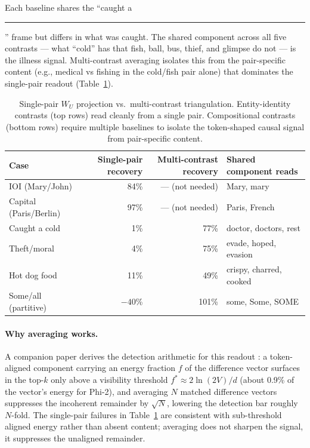 \documentclass[11pt]{article}
\newcommand{\WU}{W_U}
\begin{document}
Each baseline shares the ``caught a \rule{1em}{0.4pt}'' frame but differs in what was caught.
The shared component across all five contrasts --- what ``cold'' has that fish,
ball, bus, thief, and glimpse do not --- is the illness signal. Multi-contrast
averaging isolates this from the pair-specific content (e.g., medical vs
fishing in the cold/fish pair alone) that dominates the single-pair readout
(Table~\ref{tab:triangulation}).

\begin{table}[htbp]
\centering
\small
\begin{tabular}{lrrl}
\toprule
Case & Single-pair recovery & Multi-contrast recovery & Shared component reads \\
\midrule
IOI (Mary/John) & 84\% & --- (not needed) & Mary, mary \\
Capital (Paris/Berlin) & 97\% & --- (not needed) & Paris, French \\
Caught a cold & 1\% & 77\% & doctor, doctors, rest \\
Theft/moral & 4\% & 75\% & evade, hoped, evasion \\
Hot dog food & 11\% & 49\% & crispy, charred, cooked \\
Some/all (partitive) & $-40$\% & 101\% & some, Some, SOME \\
\bottomrule
\end{tabular}
\caption{Single-pair $\WU$ projection vs.\ multi-contrast triangulation.
Entity-identity contrasts (top rows) read cleanly from a single pair. Compositional
contrasts (bottom rows) require multiple baselines to isolate the
token-shaped causal signal from pair-specific content.}
\label{tab:triangulation}
\end{table}

\paragraph{Why averaging works.} A companion paper derives the detection
arithmetic for this readout \citep{tuomi2026visibility}: a token-aligned
component carrying an energy fraction $f$ of the difference vector
surfaces in the top-$k$ only above a visibility threshold
$f^{*} \approx 2\ln(2V)/d$ (about 0.9\% of the vector's energy for
Phi-2), and averaging $N$ matched difference vectors suppresses the
incoherent remainder by $\sqrt{N}$, lowering the detection bar roughly
$N$-fold. The single-pair failures in Table~\ref{tab:triangulation} are
consistent with sub-threshold aligned energy rather than absent content;
averaging does not sharpen the signal, it suppresses the unaligned
remainder.
\end{document}
